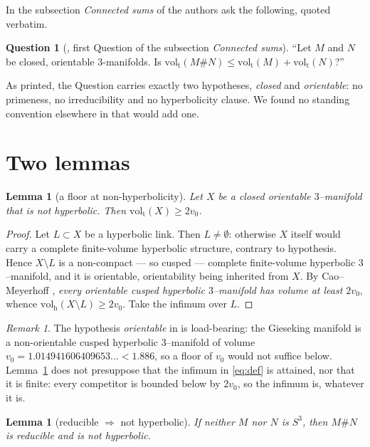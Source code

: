 \documentclass[11pt]{amsart}
\newtheorem{lemma}[theorem]{Lemma}
\theoremstyle{definition}
\newtheorem*{question}{Question}
\theoremstyle{remark}
\newtheorem*{remark}{Remark}
\newcommand{\volt}{\operatorname{vol_t}}
\newcommand{\volh}{\operatorname{vol_h}}
\begin{document}
In the subsection \emph{Connected sums} of \cite{KRSTT} the authors ask the following,
quoted verbatim.

\begin{question}[\cite{KRSTT}, first Question of the subsection \emph{Connected sums}]
``Let $M$ and $N$ be closed, orientable $3$-manifolds. Is
$\volt(M\# N)\le\volt(M)+\volt(N)$?''
\end{question}

As printed, the Question carries exactly two hypotheses, \emph{closed} and
\emph{orientable}: no primeness, no irreducibility and no hyperbolicity clause. We found no
standing convention elsewhere in \cite{KRSTT} that would add one.

\section{Two lemmas}

\begin{lemma}[a floor at non-hyperbolicity]\label{lem:floor}
Let $X$ be a closed orientable $3$--manifold that is not hyperbolic. Then
$\volt(X)\ge 2v_0$.
\end{lemma}

\begin{proof}
Let $L\subset X$ be a hyperbolic link. Then $L\ne\emptyset$: otherwise $X$ itself would
carry a complete finite-volume hyperbolic structure, contrary to hypothesis. Hence
$X\setminus L$ is a non-compact --- so cusped --- complete finite-volume hyperbolic
$3$--manifold, and it is orientable, orientability being inherited from $X$. By
Cao--Meyerhoff \cite{CM}, \emph{every orientable cusped hyperbolic $3$--manifold has volume
at least $2v_0$}, whence $\volh(X\setminus L)\ge 2v_0$. Take the infimum over $L$.
\end{proof}

\begin{remark}
The hypothesis \emph{orientable} in \cite{CM} is load-bearing: the Gieseking manifold is a
non-orientable cusped hyperbolic $3$--manifold of volume
$v_0=1.014941606409653\ldots<1.886$, so a floor of $v_0$ would not suffice below.
Lemma~\ref{lem:floor}
does not presuppose that the infimum in \eqref{eq:def} is attained, nor that it is finite:
every competitor is bounded below by $2v_0$, so the infimum is, whatever it is.
\end{remark}

\begin{lemma}[reducible $\Rightarrow$ not hyperbolic]\label{lem:red}
If neither $M$ nor $N$ is $S^3$, then $M\#N$ is reducible and is not hyperbolic.
\end{lemma}
\end{document}
